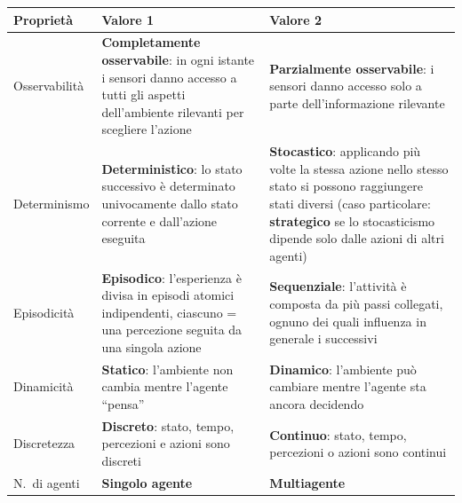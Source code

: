 \documentclass[11pt,a4paper]{report}
\begin{document}
\begin{center}
\begin{tabular}{@{}p{2.6cm}p{5cm}p{5cm}@{}}
\toprule
\textbf{Proprietà} & \textbf{Valore 1} & \textbf{Valore 2} \\
\midrule
Osservabilità & \textbf{Completamente osservabile}: in ogni istante i sensori danno accesso a tutti gli aspetti dell'ambiente rilevanti per scegliere l'azione & \textbf{Parzialmente osservabile}: i sensori danno accesso solo a parte dell'informazione rilevante \\
Determinismo & \textbf{Deterministico}: lo stato successivo è determinato univocamente dallo stato corrente e dall'azione eseguita & \textbf{Stocastico}: applicando più volte la stessa azione nello stesso stato si possono raggiungere stati diversi (caso particolare: \textbf{strategico} se lo stocasticismo dipende solo dalle azioni di altri agenti) \\
Episodicità & \textbf{Episodico}: l'esperienza è divisa in episodi atomici indipendenti, ciascuno = una percezione seguita da una singola azione & \textbf{Sequenziale}: l'attività è composta da più passi collegati, ognuno dei quali influenza in generale i successivi \\
Dinamicità & \textbf{Statico}: l'ambiente non cambia mentre l'agente ``pensa'' & \textbf{Dinamico}: l'ambiente può cambiare mentre l'agente sta ancora decidendo \\
Discretezza & \textbf{Discreto}: stato, tempo, percezioni e azioni sono discreti & \textbf{Continuo}: stato, tempo, percezioni o azioni sono continui \\
N.\ di agenti & \textbf{Singolo agente} & \textbf{Multiagente} \\
\bottomrule
\end{tabular}
\end{center}
\end{document}
